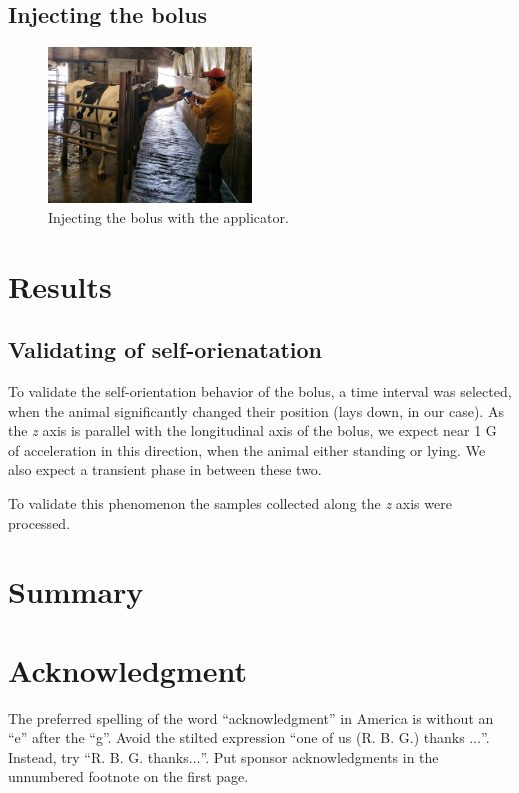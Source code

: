 \documentclass[conference]{IEEEtran}
\begin{document}
\subsection{Injecting the bolus}

\begin{figure}[htbp]
\centerline{\includegraphics[width=0.48\textwidth]{fig/bolus_application.jpg}}
  \caption{Injecting the bolus with the applicator.}
\label{bolus-gw-photo}
\end{figure}


\section{Results}

\subsection{Validating of self-orienatation}

To validate the self-orientation behavior of the bolus, a time interval was
selected, when the animal significantly changed their position (lays down,
in our case). As the \emph{z} axis is parallel with the longitudinal axis
of the bolus, we expect near 1 G of acceleration in this direction, when
the animal either standing or lying. We also expect a transient phase in
between these two.

To validate this phenomenon the samples collected along the \emph{z} axis
were processed. 

\section{Summary}

\section*{Acknowledgment}

The preferred spelling of the word ``acknowledgment'' in America is without 
an ``e'' after the ``g''. Avoid the stilted expression ``one of us (R. B. 
G.) thanks $\ldots$''. Instead, try ``R. B. G. thanks$\ldots$''. Put sponsor 
acknowledgments in the unnumbered footnote on the first page.



\end{document}
